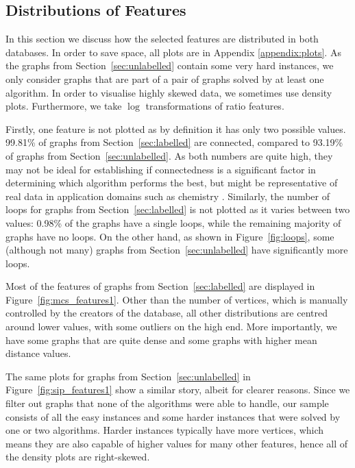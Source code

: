 \documentclass{l4proj}
\theoremstyle{definition}
\theoremstyle{remark}
\begin{document}
\subsection{Distributions of Features}

In this section we discuss how the selected features are distributed in both
databases. In order to save space, all plots are in Appendix
\ref{appendix:plots}. As the graphs from Section~\ref{sec:unlabelled} contain
some very hard instances, we only consider graphs that are part of a pair of
graphs solved by at least one algorithm. In order to visualise highly skewed
data, we sometimes use density plots. Furthermore, we take $\log$
transformations of ratio features.

Firstly, one feature is not plotted as by definition it has only two possible
values. 99.81\% of graphs from Section~\ref{sec:labelled} are connected,
compared to 93.19\% of graphs from Section~\ref{sec:unlabelled}. As both numbers
are quite high, they may not be ideal for establishing if connectedness is a
significant factor in determining which algorithm performs the best, but might
be representative of real data in application domains such as chemistry
\cite{WCMS:WCMS5}. Similarly, the number of loops for graphs from
Section~\ref{sec:labelled} is not plotted as it varies between two values:
0.98\% of the graphs have a single loops, while the remaining majority of graphs
have no loops. On the other hand, as shown in Figure~\ref{fig:loops}, some
(although not many) graphs from Section~\ref{sec:unlabelled} have significantly
more loops.

Most of the features of graphs from Section~\ref{sec:labelled} are displayed in
Figure~\ref{fig:mcs_features1}. Other than the number of vertices, which is
manually controlled by the creators of the database, all other distributions are
centred around lower values, with some outliers on the high end. More
importantly, we have some graphs that are quite dense and some graphs with
higher mean distance values.

The same plots for graphs from Section~\ref{sec:unlabelled} in
Figure~\ref{fig:sip_features1} show a similar story, albeit for clearer reasons.
Since we filter out graphs that none of the algorithms were able to handle, our
sample consists of all the easy instances and some harder instances that were
solved by one or two algorithms. Harder instances typically have more vertices,
which means they are also capable of higher values for many other features,
hence all of the density plots are right-skewed.
\end{document}
